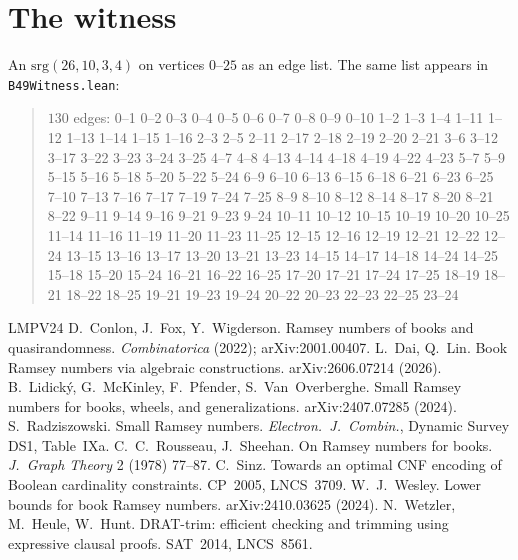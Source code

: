 \documentclass[11pt]{amsart}
\theoremstyle{definition}
\begin{document}
\appendix

\section{The witness}

An $\mathrm{srg}(26,10,3,4)$ on vertices $0$--$25$ as an edge list.
The same list appears in \texttt{B49Witness.lean}:

\begin{quote}\small
$130$ edges: 0--1 0--2 0--3 0--4 0--5 0--6 0--7 0--8 0--9 0--10
1--2 1--3 1--4 1--11 1--12 1--13 1--14 1--15 1--16
2--3 2--5 2--11 2--17 2--18 2--19 2--20 2--21
3--6 3--12 3--17 3--22 3--23 3--24 3--25
4--7 4--8 4--13 4--14 4--18 4--19 4--22 4--23
5--7 5--9 5--15 5--16 5--18 5--20 5--22 5--24
6--9 6--10 6--13 6--15 6--18 6--21 6--23 6--25
7--10 7--13 7--16 7--17 7--19 7--24 7--25
8--9 8--10 8--12 8--14 8--17 8--20 8--21 8--22
9--11 9--14 9--16 9--21 9--23 9--24
10--11 10--12 10--15 10--19 10--20 10--25
11--14 11--16 11--19 11--20 11--23 11--25
12--15 12--16 12--19 12--21 12--22 12--24
13--15 13--16 13--17 13--20 13--21 13--23
14--15 14--17 14--18 14--24 14--25
15--18 15--20 15--24
16--21 16--22 16--25
17--20 17--21 17--24 17--25
18--19 18--21 18--22 18--25
19--21 19--23 19--24
20--22 20--23 22--23 22--25 23--24
\end{quote}

\begin{thebibliography}{LMPV24}
 D.~Conlon, J.~Fox, Y.~Wigderson. Ramsey numbers
of books and quasirandomness. \emph{Combinatorica} (2022);
arXiv:2001.00407.
 L.~Dai, Q.~Lin. Book Ramsey numbers via algebraic
constructions. arXiv:2606.07214 (2026).
 B.~Lidick\'y, G.~McKinley, F.~Pfender,
S.~Van~Overberghe. Small Ramsey numbers for books, wheels, and
generalizations. arXiv:2407.07285 (2024).
 S.~Radziszowski. Small Ramsey numbers.
\emph{Electron.~J.~Combin.}, Dynamic Survey DS1, Table~IXa.
 C.~C.~Rousseau, J.~Sheehan. On Ramsey numbers
for books. \emph{J.~Graph Theory} 2 (1978) 77--87.
 C.~Sinz. Towards an optimal CNF encoding of
Boolean cardinality constraints. CP~2005, LNCS~3709.
 W.~J.~Wesley. Lower bounds for book Ramsey
numbers. arXiv:2410.03625 (2024).
 N.~Wetzler, M.~Heule, W.~Hunt. DRAT-trim:
efficient checking and trimming using expressive clausal proofs.
SAT~2014, LNCS~8561.
\end{thebibliography}
\end{document}
